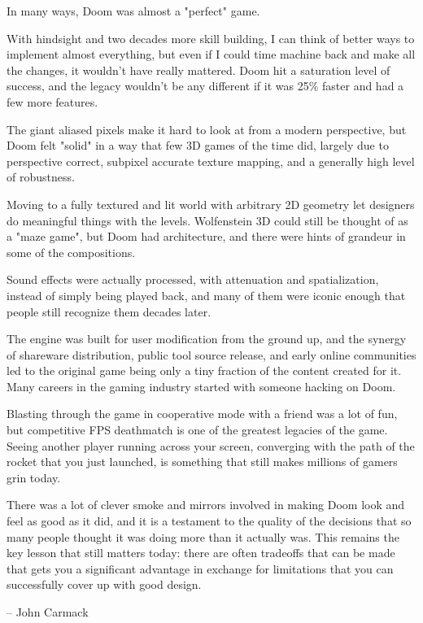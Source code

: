 
In many ways, Doom was almost a "perfect" game.\\
\par
With hindsight and two decades more skill building, I can think of better ways to implement almost everything, but even if I could time machine back and make all the changes, it wouldn't have really mattered.  Doom hit a saturation level of success, and the legacy wouldn't be any different if it was 25\% faster and had a few more features.\\
\par
 The giant aliased pixels make it hard to look at from a modern perspective, but Doom felt "solid" in a way that few 3D games of the time did, largely due to perspective correct, subpixel accurate texture mapping, and a generally high level of robustness.\\
\par
Moving to a fully textured and lit world with arbitrary 2D geometry let designers do meaningful things with the levels.  Wolfenstein 3D could still be thought of as a "maze game", but Doom had architecture, and there were hints of grandeur in some of the compositions.\\
\par
 Sound effects were actually processed, with attenuation and spatialization, instead of simply being played back, and many of them were iconic enough that people still recognize them decades later.\\
\par
 The engine was built for user modification from the ground up, and the synergy of shareware distribution, public tool source release, and early online communities led to the original game being only a tiny fraction of the content created for it.  Many careers in the gaming industry started with someone hacking on Doom.\\
\par
 Blasting through the game in cooperative mode with a friend was a lot of fun, but competitive FPS deathmatch is one of the greatest legacies of the game.  Seeing another player running across your screen, converging with the path of the rocket that you just launched, is something that still makes millions of gamers grin today.\\
\par
 There was a lot of clever smoke and mirrors involved in making Doom look and feel as good as it did, and it is a testament to the quality of the decisions that so many people thought it was doing more than it actually was.  This remains the key lesson that still matters today: there are often tradeoffs that can be made that gets you a significant advantage in exchange for limitations that you can successfully cover up with good design.\\
\par
-- John Carmack\\
\par
